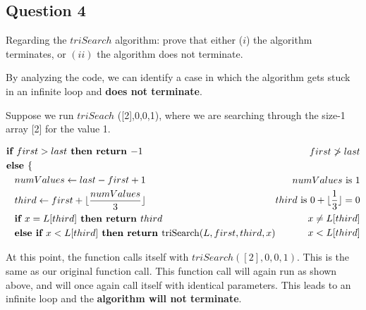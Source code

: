 \documentclass[12pt]{article}
\begin{document}
    \subsection*{Question 4}
        Regarding the $triSearch$ algorithm: prove that either ($i$) the algorithm terminates, or $(ii)$ the algorithm does not terminate. 

        By analyzing the code, we can identify a case in which the algorithm gets stuck in an infinite loop and \textbf{does not terminate}.

        Suppose we run $triSeach$ ([2],0,0,1), where we are searching through the size-1 array [2] for the value 1.

        \begin{align*}
            \begin{split}
                &\textbf{if $first > last$ then return $-1$}\\
                &\textbf{else }\{\\
                &\textbf{\hspace*{3mm}$numValues \leftarrow{} last-first+1$}\\
                &\textbf{\hspace*{3mm}$third \leftarrow{} first + \lfloor\frac{numValues}{3}\rfloor$}\\
                &\textbf{\hspace*{3mm}if $x=L[third]$ then return $third$}\\
                &\textbf{\hspace*{3mm}else if $x < L[third]$ then return \textnormal{triSearch}$ (L, f irst, third, x)$}
            \end{split}
            \begin{split}
                \text{$first \ngtr last$}\\
                \text{}\\
                \text{$numValues$ is $1$}\\
                \text{$third$ is $0+\lfloor\frac{1}{3}\rfloor=0$}\\
                \text{$x\neq L[third]$}\\
                \text{$x<L[third]$}
            \end{split}
        \end{align*}    

        At this point, the function calls itself with $triSearch([2],0,0,1)$. This is the same as our original function call. This function call will again run as shown above, and will once again call itself with identical parameters. This leads to an infinite loop and the \textbf{algorithm will not terminate}.
 
\end{document}
